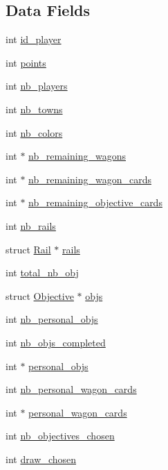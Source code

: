 \subsection*{Data Fields}
\begin{DoxyCompactItemize}
\item 
int \hyperlink{structPlayer_a7a793a40560fbe6a7df025a117e93272}{id\-\_\-player}
\item 
int \hyperlink{structPlayer_af7f8f4a4e39e09fdb5e9f02330ecabef}{points}
\item 
int \hyperlink{structPlayer_a973dc11c7f9c09051fa782fde7863008}{nb\-\_\-players}
\item 
int \hyperlink{structPlayer_ae5e7951963b1f7f7c7b80f42c7a6b04c}{nb\-\_\-towns}
\item 
int \hyperlink{structPlayer_a124f37fc2c314fcfaf31544e4cd44e04}{nb\-\_\-colors}
\item 
int $\ast$ \hyperlink{structPlayer_a59bb1b4ae5e06f9146329fb82bfc1fd8}{nb\-\_\-remaining\-\_\-wagons}
\item 
int $\ast$ \hyperlink{structPlayer_a0fb92c4053d85148a96e9d22c796a76d}{nb\-\_\-remaining\-\_\-wagon\-\_\-cards}
\item 
int $\ast$ \hyperlink{structPlayer_a1773af477d4422d225e2611b07a0d562}{nb\-\_\-remaining\-\_\-objective\-\_\-cards}
\item 
int \hyperlink{structPlayer_a562c60af4150255b182aec231848d6ee}{nb\-\_\-rails}
\item 
struct \hyperlink{structRail}{Rail} $\ast$ \hyperlink{structPlayer_ac10a216b2c62ce10b7f08f2f9f4eb0b9}{rails}
\item 
int \hyperlink{structPlayer_acc2384127a7ee30a148aed382793ac45}{total\-\_\-nb\-\_\-obj}
\item 
struct \hyperlink{structObjective}{Objective} $\ast$ \hyperlink{structPlayer_a67d8ce3ce9168c68cd75c3055fd9ac38}{objs}
\item 
int \hyperlink{structPlayer_a433a97164a6a81495cbfa182ea9c1595}{nb\-\_\-personal\-\_\-objs}
\item 
int \hyperlink{structPlayer_ad3848dcc6461808764a8a9a2edd51f2e}{nb\-\_\-objs\-\_\-completed}
\item 
int $\ast$ \hyperlink{structPlayer_a8a02542940938a5fefa5bfe6dfeabb25}{personal\-\_\-objs}
\item 
int \hyperlink{structPlayer_a5bd2c82fb0dd0f0b540423e8793afe4d}{nb\-\_\-personal\-\_\-wagon\-\_\-cards}
\item 
int $\ast$ \hyperlink{structPlayer_a2fe65be556aa052d9443725c575df02e}{personal\-\_\-wagon\-\_\-cards}
\item 
int \hyperlink{structPlayer_a5b9e0fc618ea17cf04e114d28b2c253b}{nb\-\_\-objectives\-\_\-chosen}
\item 
int \hyperlink{structPlayer_a7c4c6059396a73859fc4dc4591f0c1af}{draw\-\_\-chosen}
\end{DoxyCompactItemize}


